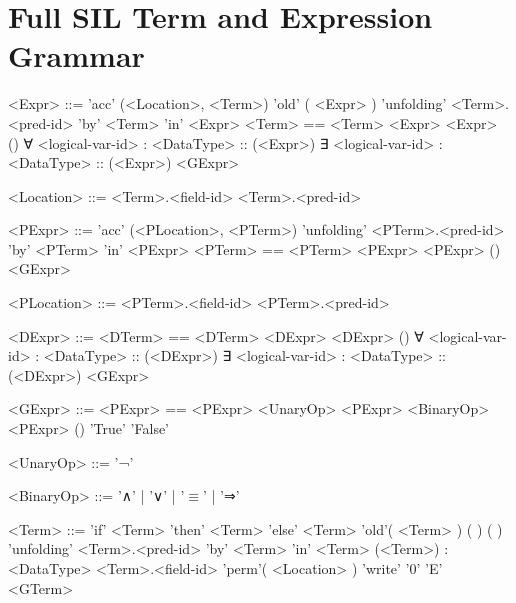 
\section{Full SIL Term and Expression Grammar}\label{apdx:grammar}
\begin{grammar}
<Expr> ::= 'acc' (<Location>, <Term>)
	\alt 'old' ( <Expr> )
	\alt 'unfolding' <Term>.<pred-id> 'by' <Term> 'in' <Expr>
	\alt <Term> == <Term>
	\alt <unary-op> <Expr>
	\alt <binary-op> <Expr>
	\alt <dom-pred-id>()
	\alt ∀ <logical-var-id> : <DataType> :: (<Expr>)
	\alt ∃ <logical-var-id> : <DataType> :: (<Expr>)
	\alt <GExpr>

<Location> ::= <Term>.<field-id>
	\alt <Term>.<pred-id>
\end{grammar}

\begin{grammar}
<PExpr> ::= 'acc' (<PLocation>, <PTerm>)
	\alt 'unfolding' <PTerm>.<pred-id> 'by' <PTerm> 'in' <PExpr>
	\alt <PTerm> == <PTerm>
	\alt <unary-op> <PExpr>
	\alt <binary-op> <PExpr>
	\alt <dom-pred-id>()
	\alt <GExpr>

<PLocation> ::= <PTerm>.<field-id>
	\alt <PTerm>.<pred-id>
\end{grammar}

\begin{grammar}
<DExpr> ::= <DTerm> == <DTerm>
	\alt <unary-op> <DExpr>
	\alt <binary-op> <DExpr>
	\alt <dom-pred-id>()
	\alt ∀ <logical-var-id> : <DataType> :: (<DExpr>)
	\alt ∃ <logical-var-id> : <DataType> :: (<DExpr>)
	\alt <GExpr>
\end{grammar}

\begin{grammar}
<GExpr> ::= <PExpr> == <PExpr>
	\alt <UnaryOp> <PExpr>
	\alt <BinaryOp> <PExpr>
	\alt <dom-pred-id>()
	\alt 'True'
	\alt 'False'
\end{grammar}

\begin{grammar}
<UnaryOp> ::= '¬'

<BinaryOp> ::= '∧' | '∨' | '$\equiv$' | '⇒'
\end{grammar}

\begin{grammar}
<Term> ::= 'if' <Term> 'then' <Term> 'else' <Term>
	\alt 'old'( <Term> )
	\alt <func-id>(  )
	\alt <dom-func-id>(  )
	\alt 'unfolding' <Term>.<pred-id> 'by' <Term> 'in' <Term>
	\alt (<Term>) : <DataType>
	\alt <Term>.<field-id>
	\alt 'perm'( <Location> )
	\alt 'write'
	\alt '0'
	\alt  'E'
	\alt <GTerm>
\end{grammar}

